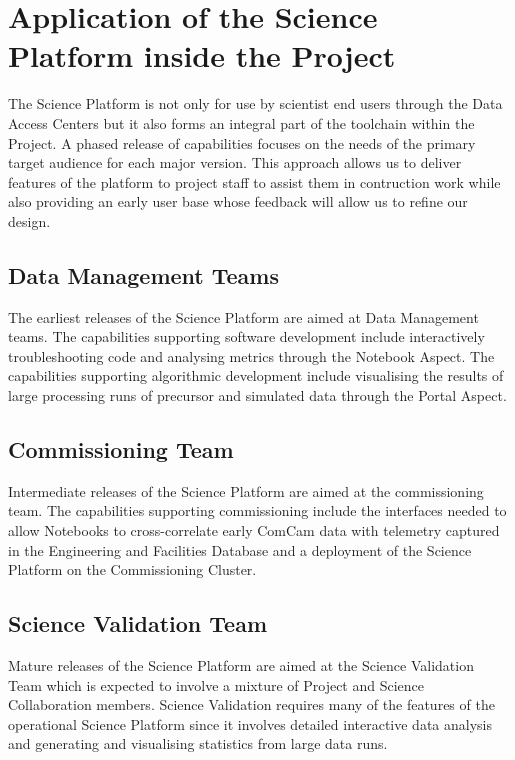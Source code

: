 \section{Application of the Science Platform inside the Project}\label{application-of-the-science-platform-inside-the-project}

The Science Platform is not only for use by scientist end users through the Data Access Centers but it also forms an integral part of the toolchain within the Project. A phased release of capabilities focuses on the needs of the primary target audience for each major version. This approach allows us to deliver features of the platform to project staff to assist them in contruction work while also providing an early user base whose feedback will allow us to refine our design. 

\subsection{Data Management Teams}\label{developer-support}

The earliest releases of the Science Platform are aimed at Data Management teams. The capabilities supporting software development include interactively troubleshooting code and analysing metrics through the Notebook Aspect. The capabilities supporting algorithmic development include visualising the results of large processing runs of precursor and simulated data through the Portal Aspect. 

\subsection{Commissioning Team}\label{commissioning}

Intermediate releases of the Science Platform are aimed at the commissioning team. The capabilities supporting commissioning include the interfaces needed to allow Notebooks to cross-correlate early ComCam data with telemetry captured in the Engineering and Facilities Database and a deployment of the Science Platform on the Commissioning Cluster.

\subsection{Science Validation Team} 

Mature releases of the Science Platform are aimed at the Science Validation Team which is expected to involve a mixture of Project and Science Collaboration members. Science Validation requires many of the features of the operational Science Platform since it involves detailed interactive data analysis and generating and visualising statistics from large data runs.


